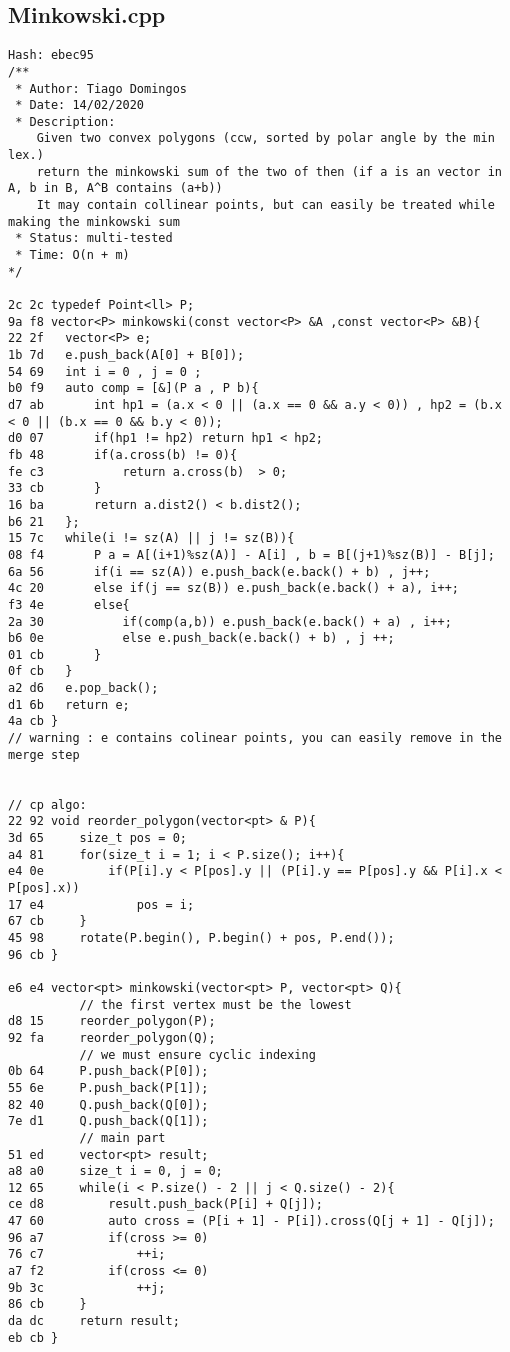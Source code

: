 \documentclass[11pt, a4paper, twoside]{article}
\begin{document}
\subsection{Minkowski.cpp}
\begin{lstlisting}
Hash: ebec95
/**
 * Author: Tiago Domingos
 * Date: 14/02/2020
 * Description:
	Given two convex polygons (ccw, sorted by polar angle by the min lex.)
	return the minkowski sum of the two of then (if a is an vector in A, b in B, A^B contains (a+b))
	It may contain collinear points, but can easily be treated while making the minkowski sum
 * Status: multi-tested 
 * Time: O(n + m)
*/

2c 2c typedef Point<ll> P;
9a f8 vector<P> minkowski(const vector<P> &A ,const vector<P> &B){
22 2f 	vector<P> e;
1b 7d 	e.push_back(A[0] + B[0]);
54 69 	int i = 0 , j = 0 ;
b0 f9 	auto comp = [&](P a , P b){
d7 ab 		int hp1 = (a.x < 0 || (a.x == 0 && a.y < 0)) , hp2 = (b.x < 0 || (b.x == 0 && b.y < 0));
d0 07 		if(hp1 != hp2) return hp1 < hp2;
fb 48 		if(a.cross(b) != 0){
fe c3 			return a.cross(b)  > 0;
33 cb 		}
16 ba 		return a.dist2() < b.dist2();
b6 21 	};
15 7c 	while(i != sz(A) || j != sz(B)){
08 f4 		P a = A[(i+1)%sz(A)] - A[i] , b = B[(j+1)%sz(B)] - B[j];
6a 56 		if(i == sz(A)) e.push_back(e.back() + b) , j++;
4c 20 		else if(j == sz(B)) e.push_back(e.back() + a), i++;
f3 4e 		else{
2a 30 			if(comp(a,b)) e.push_back(e.back() + a) , i++;
b6 0e 			else e.push_back(e.back() + b) , j ++;
01 cb 		}
0f cb 	}
a2 d6 	e.pop_back();
d1 6b 	return e;
4a cb }
// warning : e contains colinear points, you can easily remove in the merge step 


// cp algo:
22 92 void reorder_polygon(vector<pt> & P){
3d 65     size_t pos = 0;
a4 81     for(size_t i = 1; i < P.size(); i++){
e4 0e         if(P[i].y < P[pos].y || (P[i].y == P[pos].y && P[i].x < P[pos].x))
17 e4             pos = i;
67 cb     }
45 98     rotate(P.begin(), P.begin() + pos, P.end());
96 cb }

e6 e4 vector<pt> minkowski(vector<pt> P, vector<pt> Q){
          // the first vertex must be the lowest
d8 15     reorder_polygon(P);
92 fa     reorder_polygon(Q);
          // we must ensure cyclic indexing
0b 64     P.push_back(P[0]);
55 6e     P.push_back(P[1]);
82 40     Q.push_back(Q[0]);
7e d1     Q.push_back(Q[1]);
          // main part
51 ed     vector<pt> result;
a8 a0     size_t i = 0, j = 0;
12 65     while(i < P.size() - 2 || j < Q.size() - 2){
ce d8         result.push_back(P[i] + Q[j]);
47 60         auto cross = (P[i + 1] - P[i]).cross(Q[j + 1] - Q[j]);
96 a7         if(cross >= 0)
76 c7             ++i;
a7 f2         if(cross <= 0)
9b 3c             ++j;
86 cb     }
da dc     return result;
eb cb }
\end{lstlisting}
\end{document}
